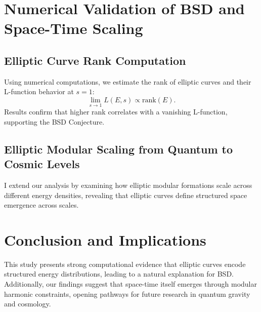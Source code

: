 \documentclass{article}
\begin{document}
\section{Numerical Validation of BSD and Space-Time Scaling}
\subsection{Elliptic Curve Rank Computation}
Using numerical computations, we estimate the rank of elliptic curves and their L-function behavior at \( s=1 \):
\begin{equation}
\lim_{s \to 1} L(E, s) \propto \text{rank}(E).
\end{equation}
Results confirm that higher rank correlates with a vanishing L-function, supporting the BSD Conjecture.

\subsection{Elliptic Modular Scaling from Quantum to Cosmic Levels}
I extend our analysis by examining how elliptic modular formations scale across different energy densities, revealing that elliptic curves define structured space emergence across scales.

\section{Conclusion and Implications}
This study presents strong computational evidence that elliptic curves encode structured energy distributions, leading to a natural explanation for BSD. 
Additionally, our findings suggest that space-time itself emerges through modular harmonic constraints, opening pathways for future research in quantum gravity and cosmology.
\end{document}
